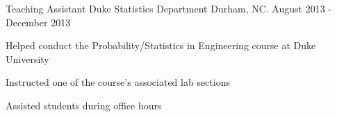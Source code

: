 \documentclass[11pt, a4paper]{awesome-cv}
\begin{document}
\begin{cventries}
  \cventry
    {Teaching Assistant}
    {Duke Statistics Department}
    {Durham, NC.}
    {August 2013 - December 2013}
    {
      \begin{cvitems}
        \item{Helped conduct the Probability/Statistics in Engineering course at Duke University}
        \item{Instructed one of the course’s associated lab sections}
        \item{Assisted students during office hours}
      \end{cvitems} 
    }

\end{cventries}
\end{document}
